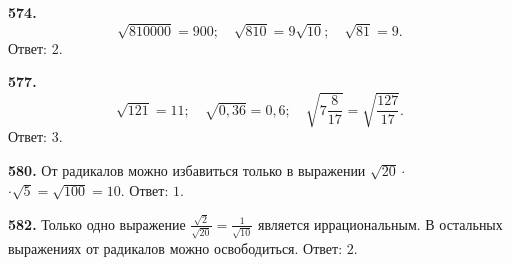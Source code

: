 \textbf{574.} $$\sqrt{810000}=900;\quad \sqrt{810}=9\sqrt{10};\quad \sqrt{81}=9.$$ \newline \null \hspace*{\fill} Ответ: $2$. 

\textbf{577.} $$\sqrt{121}=11;\quad \sqrt{0,36}=0,6;\quad \sqrt{7\frac{8}{17}}=\sqrt{\frac{127}{17}}.$$ \newline \null \hspace*{\fill} \newline \null \hspace*{\fill} Ответ: $3$. 

\textbf{580.} От радикалов можно избавиться только в выражении $\sqrt{20}\cdot$\newline$\cdot\sqrt5=\sqrt{100}=10$. \newline \null \hspace*{\fill} Ответ: $1$.

\textbf{582.} Только одно выражение $\frac{\sqrt2}{\sqrt{20}}=\frac{1}{\sqrt{10}}$ является иррациональным. В остальных выражениях от радикалов можно освободиться. \newline \null \hspace*{\fill} Ответ: $2$.
